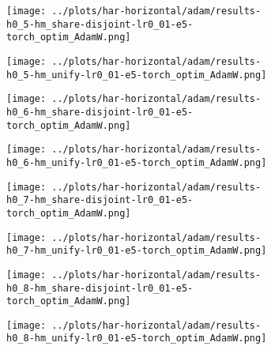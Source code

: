 \begin{figure}[htbp]  %
    \centering
    \begin{subfigure}[b]{0.47\textwidth}
        \centering
        \texttt{[image: ../plots/har-horizontal/adam/results-h0\_5-hm\_share-disjoint-lr0\_01-e5-torch\_optim\_AdamW.png]}
    \end{subfigure}
    \hfill
    \begin{subfigure}[b]{0.47\textwidth}
        \centering
        \texttt{[image: ../plots/har-horizontal/adam/results-h0\_5-hm\_unify-lr0\_01-e5-torch\_optim\_AdamW.png]}
    \end{subfigure}
\end{figure}
\begin{figure}[htbp]  %
    \centering
    \begin{subfigure}[b]{0.47\textwidth}
        \centering
        \texttt{[image: ../plots/har-horizontal/adam/results-h0\_6-hm\_share-disjoint-lr0\_01-e5-torch\_optim\_AdamW.png]}
    \end{subfigure}
    \hfill
    \begin{subfigure}[b]{0.47\textwidth}
        \centering
        \texttt{[image: ../plots/har-horizontal/adam/results-h0\_6-hm\_unify-lr0\_01-e5-torch\_optim\_AdamW.png]}
    \end{subfigure}
\end{figure}
\begin{figure}[htbp]  %
    \centering
    \begin{subfigure}[b]{0.47\textwidth}
        \centering
        \texttt{[image: ../plots/har-horizontal/adam/results-h0\_7-hm\_share-disjoint-lr0\_01-e5-torch\_optim\_AdamW.png]}
    \end{subfigure}
    \hfill
    \begin{subfigure}[b]{0.47\textwidth}
        \centering
        \texttt{[image: ../plots/har-horizontal/adam/results-h0\_7-hm\_unify-lr0\_01-e5-torch\_optim\_AdamW.png]}
    \end{subfigure}
\end{figure}
\begin{figure}[htbp]  %
    \centering
    \begin{subfigure}[b]{0.47\textwidth}
        \centering
        \texttt{[image: ../plots/har-horizontal/adam/results-h0\_8-hm\_share-disjoint-lr0\_01-e5-torch\_optim\_AdamW.png]}
    \end{subfigure}
    \hfill
    \begin{subfigure}[b]{0.47\textwidth}
        \centering
        \texttt{[image: ../plots/har-horizontal/adam/results-h0\_8-hm\_unify-lr0\_01-e5-torch\_optim\_AdamW.png]}
    \end{subfigure}
\end{figure}
